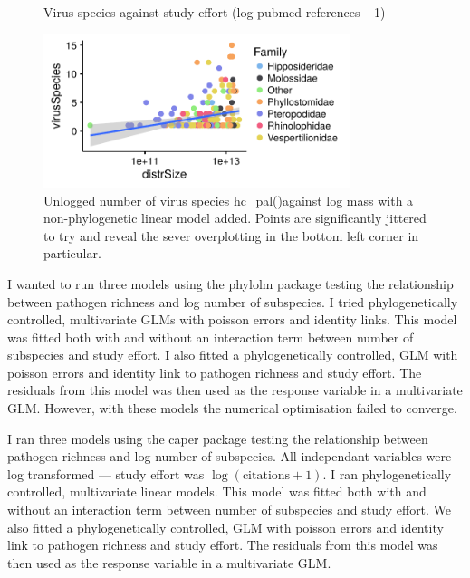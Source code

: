 \begin{knitrout}
\begin{figure}[t]
{}

\caption[Virus species against study effort (log pubmed references +1)]{Virus species against study effort (log pubmed references +1)}\label{fig:subsDataviz}
\end{figure}

\begin{figure}[t]

{\centering \includegraphics[width=0.8\textwidth]{figure/subsDataviz-6} 

}

\caption[Unlogged number of virus species hc_pal()against log mass with a non-phylogenetic linear model added]{Unlogged number of virus species hc_pal()against log mass with a non-phylogenetic linear model added. Points are significantly jittered to try and reveal the sever overplotting in the bottom left corner in particular.}\label{fig:subsDataviz}
\end{figure}


\end{knitrout}


I wanted to run three models using the phylolm package testing the relationship between pathogen richness and log number of subspecies.
I tried phylogenetically controlled, multivariate GLMs with poisson errors and identity links.
This model was fitted both with and without an interaction term between number of subspecies and study effort.
I also fitted a phylogenetically controlled, GLM with poisson errors and identity link to pathogen richness and study effort.
The residuals from this model was then used as the response variable in a multivariate GLM.
However, with these models the numerical optimisation failed to converge.

I ran three models using the caper package \cite{caper} testing the relationship between pathogen richness and log number of subspecies.
All independant variables were log transformed --- study effort was $\log(\text{citations} + 1)$.
I ran phylogenetically controlled, multivariate linear models.
This model was fitted both with and without an interaction term between number of subspecies and study effort.
We also fitted a phylogenetically controlled, GLM with poisson errors and identity link to pathogen richness and study effort.
The residuals from this model was then used as the response variable in a multivariate GLM.



